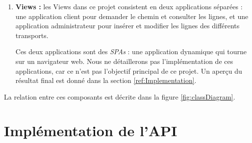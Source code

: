 \begin{enumerate}
	\item \textbf{Views :} les Views dans ce projet consistent en deux applications séparées : une application client pour demander le chemin et consulter les lignes, et une application administrateur pour insérer et modifier les lignes des différents transports.
	      
	      Ces deux applications sont des \emph{\Glspl{SPA}} : une application dynamique qui tourne sur un navigateur web.
	      Nous ne détaillerons pas l'implémentation de ces applications, car ce n'est pas l'objectif principal de ce projet. Un aperçu du résultat final est donné dans la section \ref{ref:Implementation}.
\end{enumerate}
La relation entre ces composants est décrite dans la figure \ref{fig:classDiagram}.
	
	
\section{Implémentation de l'API}
\label{ref:API}

